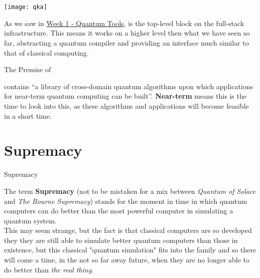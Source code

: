 \documentclass[aspectratio=43]{beamer}
\begin{document}
\section{\qka}
\begin{frame}{\qka}
    \begin{center}
        \texttt{[image: qka]}
    \end{center}
    \begin{card}
        As we saw in \href{\weekOne}{Week 1 - Quantum Tools}, \qka is the top-level block on the \qk full-stack infrastructure. This means it works on a higher level then what we have seen so far, abstracting a quantum compiler and providing an interface much similar to that of classical computing.
    \end{card}
\pagenumber
\end{frame}

\begin{frame}{The Premise of \qka}
    \begin{card}
        \qka contains ``a library of cross-domain quantum algorithms upon which applications for near-term quantum computing can be built''. \textbf{Near-term} means this is the time to look into this, as these algorithms and applications will become feasible in a short time. 
    \end{card}
\pagenumber
\end{frame}

\section{\q Supremacy}
\begin{frame}{\q Supremacy}
    \begin{card}
        The term \textbf{\q Supremacy} (not to be mistaken for a mix between \textit{Quantum of Solace} and \textit{The Bourne Supremacy}) stands for the moment in time in which quantum computers can do better than the most powerful computer in simulating a quantum system.\\
        This may seem strange, but the fact is that classical computers are so developed they they are still able to simulate better quantum computers than those in existence, but this classical "quantum simulation" fits into the \np family and so there will come a time, in the not so far away future, when they are no longer able to do better than \textit{the real thing}. 
    \end{card}
\pagenumber
\end{frame}
\end{document}
